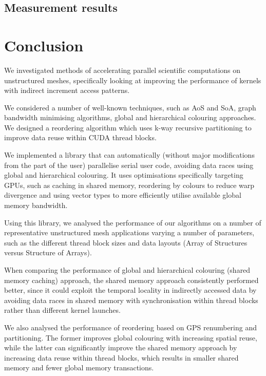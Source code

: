 \subsection{Measurement results}\label{measurement-results}



\section{Conclusion}\label{conclusion}

We investigated methods of accelerating parallel scientific computations on
unstructured meshes, specifically looking at improving the performance of
kernels with indirect increment access patterns.

We considered a number of well-known techniques, such as AoS and SoA, graph bandwidth minimising algorithms, global and hierarchical colouring approaches. We designed a reordering algorithm which uses k-way recursive partitioning to
improve data reuse within CUDA thread blocks.

We implemented a library that can automatically (without major modifications
from the part of the user) parallelise serial user code, avoiding data races
using global and hierarchical colouring. It uses optimisations specifically
targeting GPUs, such as caching in shared memory, reordering by colours to
reduce warp divergence and using vector types to more efficiently utilise
available global memory bandwidth.

Using this library, we analysed the performance of our algorithms on a number of
representative unstructured mesh applications varying a number of parameters,
such as the different thread block sizes and data layouts (Array of Structures
versus Structure of Arrays).

When comparing the performance of global and hierarchical colouring (shared
memory caching) approach, the shared memory approach consistently performed
better, since it could exploit the temporal locality in indirectly accessed data
by avoiding data races in shared memory with synchronisation within thread
blocks rather than different kernel launches.

We also analysed the performance of reordering based on GPS renumbering and
partitioning. The former improves global colouring with increasing spatial
reuse, while the latter can significantly improve the shared memory approach by
increasing data reuse within thread blocks, which results in smaller shared
memory and fewer global memory transactions.


